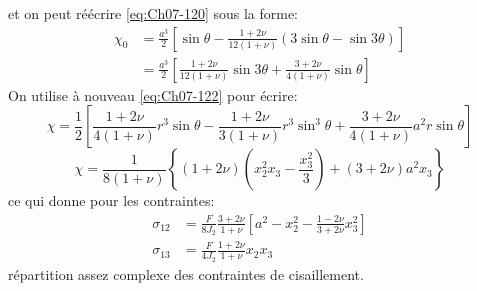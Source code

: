 et on peut réécrire \eqref{eq:Ch07-120} sous la forme: 
\begin{equation}
    \begin{aligned}
        \chi_0 &= \frac{a^3}{2} \left[ \sin \theta - \frac{1+2\nu}{12 (1+\nu)} \left( 3 \sin \theta - \sin 3 \theta \right) \right] \\
        &= \frac{a^3}{2} \left[ \frac{1+2\nu}{12(1+\nu)} \sin 3 \theta + \frac{3 + 2\nu}{4(1+\nu)} \sin \theta \right]
    \end{aligned}
    \label{eq:Ch07-123}
\end{equation}
On utilise à nouveau \eqref{eq:Ch07-122} pour écrire:
\begin{displaymath}
    \chi = \frac{1}{2} \left[ \frac{1+2\nu}{4(1+\nu)} r^3 \sin \theta - \frac{1+2\nu}{3(1+\nu)} r^3 \sin^3 \theta + \frac{3+2\nu}{4(1+\nu)}a^2 r \sin \theta \right]
\end{displaymath}
\begin{equation}
    \chi = \frac{1}{8(1+\nu)} \left\{ (1+2\nu) \left( x_2^2 x_3 - \frac{x_3^2}{3}\right) + (3+2\nu) a^2 x_3 \right\}
    \label{eq:Ch07-124}
\end{equation}
ce qui donne pour les contraintes: 
\begin{equation}
    \begin{aligned}
        \sigma_{12} &= \frac{F}{8J_2} \frac{3+2\nu}{1+\nu} \left[ a^2 - x_2^2 - \frac{1-2\nu}{3+ 2\nu}x_3^2 \right] \\
        \sigma_{13} &= \frac{F}{4J_2} \frac{1+2\nu}{1+\nu} x_2 x_3
    \end{aligned}
    \label{eq:Ch07-125}
\end{equation}
répartition assez complexe des contraintes de cisaillement. 

